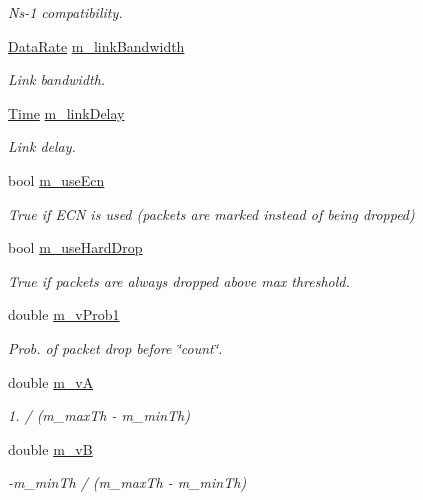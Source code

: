 \begin{DoxyCompactItemize}
\begin{DoxyCompactList}\small\item\em Ns-\/1 compatibility. \end{DoxyCompactList}\item 
\hyperlink{classns3_1_1DataRate}{Data\+Rate} \hyperlink{classns3_1_1RedQueueDisc_a036e8100b2bc17d9b7c3bf5184126f95}{m\+\_\+link\+Bandwidth}
\begin{DoxyCompactList}\small\item\em Link bandwidth. \end{DoxyCompactList}\item 
\hyperlink{classns3_1_1Time}{Time} \hyperlink{classns3_1_1RedQueueDisc_a0109dcd4dab3f32348454bc24c991683}{m\+\_\+link\+Delay}
\begin{DoxyCompactList}\small\item\em Link delay. \end{DoxyCompactList}\item 
bool \hyperlink{classns3_1_1RedQueueDisc_a58b23b6b5bda347f158108859bab4404}{m\+\_\+use\+Ecn}
\begin{DoxyCompactList}\small\item\em True if E\+CN is used (packets are marked instead of being dropped) \end{DoxyCompactList}\item 
bool \hyperlink{classns3_1_1RedQueueDisc_a4338af4ddd64c4b11b029eb31728d0ba}{m\+\_\+use\+Hard\+Drop}
\begin{DoxyCompactList}\small\item\em True if packets are always dropped above max threshold. \end{DoxyCompactList}\item 
double \hyperlink{classns3_1_1RedQueueDisc_a1f46b551657e62ae3064e392fdd6535b}{m\+\_\+v\+Prob1}
\begin{DoxyCompactList}\small\item\em Prob. of packet drop before \char`\"{}count\char`\"{}. \end{DoxyCompactList}\item 
double \hyperlink{classns3_1_1RedQueueDisc_a03f1bf584c3f8f07a33719f54b73dd76}{m\+\_\+vA}
\begin{DoxyCompactList}\small\item\em 1. / (m\+\_\+max\+Th -\/ m\+\_\+min\+Th) \end{DoxyCompactList}\item 
double \hyperlink{classns3_1_1RedQueueDisc_a983ababdb1d4eecd65c2f08af7ab5cd3}{m\+\_\+vB}
\begin{DoxyCompactList}\small\item\em -\/m\+\_\+min\+Th / (m\+\_\+max\+Th -\/ m\+\_\+min\+Th) \end{DoxyCompactList}\item 

\end{DoxyCompactItemize}
